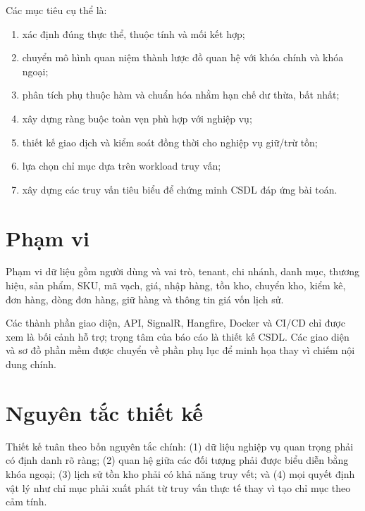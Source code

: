 Các mục tiêu cụ thể là:
\begin{enumerate}
    \item xác định đúng thực thể, thuộc tính và mối kết hợp;
    \item chuyển mô hình quan niệm thành lược đồ quan hệ với khóa chính và khóa ngoại;
    \item phân tích phụ thuộc hàm và chuẩn hóa nhằm hạn chế dư thừa, bất nhất;
    \item xây dựng ràng buộc toàn vẹn phù hợp với nghiệp vụ;
    \item thiết kế giao dịch và kiểm soát đồng thời cho nghiệp vụ giữ/trừ tồn;
    \item lựa chọn chỉ mục dựa trên workload truy vấn;
    \item xây dựng các truy vấn tiêu biểu để chứng minh CSDL đáp ứng bài toán.
\end{enumerate}

\section{Phạm vi}

Phạm vi dữ liệu gồm người dùng và vai trò, tenant, chi nhánh, danh mục, thương hiệu, sản phẩm, SKU, mã vạch, giá, nhập hàng, tồn kho, chuyển kho, kiểm kê, đơn hàng, dòng đơn hàng, giữ hàng và thông tin giá vốn lịch sử.

Các thành phần giao diện, API, SignalR, Hangfire, Docker và CI/CD chỉ được xem là bối cảnh hỗ trợ; trọng tâm của báo cáo là thiết kế CSDL. Các giao diện và sơ đồ phần mềm được chuyển về phần phụ lục để minh họa thay vì chiếm nội dung chính.

\section{Nguyên tắc thiết kế}

Thiết kế tuân theo bốn nguyên tắc chính: (1) dữ liệu nghiệp vụ quan trọng phải có định danh rõ ràng; (2) quan hệ giữa các đối tượng phải được biểu diễn bằng khóa ngoại; (3) lịch sử tồn kho phải có khả năng truy vết; và (4) mọi quyết định vật lý như chỉ mục phải xuất phát từ truy vấn thực tế thay vì tạo chỉ mục theo cảm tính.
